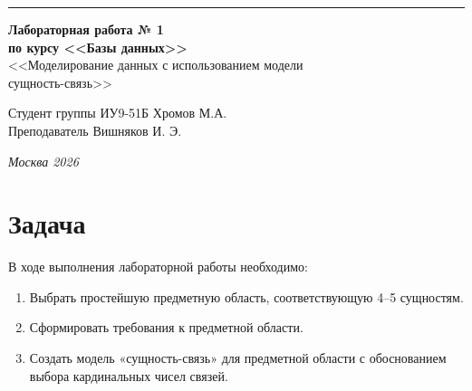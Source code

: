 \documentclass[a4paper, 14pt]{extarticle}
\begin{document}
\begin{titlepage}
\vspace*{-16pt}
\hspace{30pt}\rule{0.866\textwidth}{0.4pt}
  
\vspace{11em}

\begin{center}
\Large {\bf Лабораторная работа № 1} \\

\large {\bf по курсу <<Базы данных>>} \\[0.8cm]

\large <<Моделирование данных с использованием модели\\
сущность-связь>>
\end{center}
\normalsize

\vspace{8em}


\begin{flushright}
  {Студент группы ИУ9-51Б Хромов М.А. \hspace*{15pt}\\ 
  \vspace{2ex}
  Преподаватель Вишняков И. Э.\hspace*{15pt}}
\end{flushright}

\bigskip

\vfill
 

\begin{center}
\textsl{Москва 2026}
\end{center}
\end{titlepage}



\setcounter{page}{2}

\section{Задача}

В ходе выполнения лабораторной работы необходимо:
\begin{enumerate}
  \item Выбрать простейшую предметную область, соответствующую 4--5 сущностям.
  \item Сформировать требования к предметной области.
  \item Создать модель «сущность-связь» для предметной области с обоснованием выбора кардинальных чисел связей.
\end{enumerate}
\end{document}
